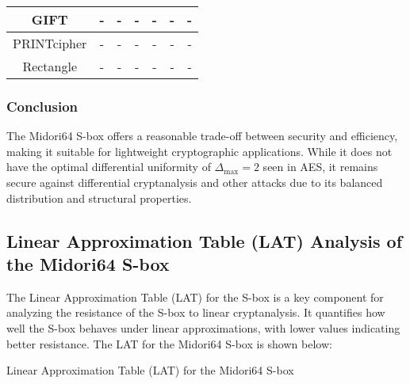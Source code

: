 \begin{table}[h!]
{\begin{tabular}{|c|c|c|c|c|c|c|}
			GIFT                 & -                      & -                      & -                      & -                       & -                                & -                                \\ \hline
			PRINTcipher          & -                      & -                      & -                      & -                       & -                                & -                                \\ \hline
			Rectangle            & -                      & -                      & -                      & -                       & -                                & -                                \\ \hline
		\end{tabular}%
	}
\end{table}



\subsubsection*{Conclusion}

The Midori64 S-box offers a reasonable trade-off between security and
efficiency, making it suitable for lightweight cryptographic applications. While
it does not have the optimal differential uniformity of \( \Delta_{\text{max}} = 2 \)
seen in AES, it remains secure against differential cryptanalysis and other
attacks due to its balanced distribution and structural properties.

\subsection{Linear Approximation Table (LAT) Analysis of the Midori64 S-box}

\noindent The Linear Approximation Table (LAT) for the S-box is a key component
for analyzing the resistance of the S-box to linear cryptanalysis. It quantifies
how well the S-box behaves under linear approximations, with lower values
indicating better resistance. The LAT for the Midori64 S-box is shown below:

\begin{table}[h!]
	\centering
	\label{tab:lat}
	\caption{Linear Approximation Table (LAT) for the Midori64 S-box}
	\setlength{\tabcolsep}{8pt}
	\vspace{12pt}
	
\end{table}

